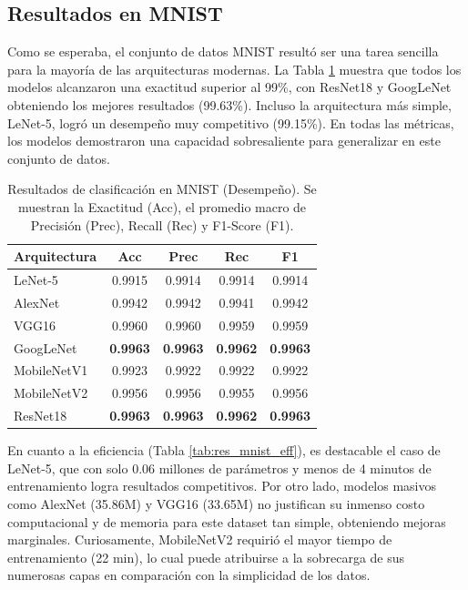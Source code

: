\documentclass{pas}
\begin{document}
\subsection{Resultados en MNIST}

Como se esperaba, el conjunto de datos MNIST resultó ser una tarea sencilla para la mayoría de las arquitecturas modernas. La Tabla \ref{tab:res_mnist_perf} muestra que todos los modelos alcanzaron una exactitud superior al 99\%, con ResNet18 y GoogLeNet obteniendo los mejores resultados (99.63\%). Incluso la arquitectura más simple, LeNet-5, logró un desempeño muy competitivo (99.15\%). En todas las métricas, los modelos demostraron una capacidad sobresaliente para generalizar en este conjunto de datos.

\begin{table}[H]
\centering
\caption{Resultados de clasificación en MNIST (Desempeño). Se muestran la Exactitud (Acc), el promedio macro de Precisión (Prec), Recall (Rec) y F1-Score (F1).}
\label{tab:res_mnist_perf}
\begin{tabular}{lcccc}
\hline
\textbf{Arquitectura} & \textbf{Acc} & \textbf{Prec} & \textbf{Rec} & \textbf{F1} \\ \hline
LeNet-5 & 0.9915 & 0.9914 & 0.9914 & 0.9914 \\
AlexNet & 0.9942 & 0.9942 & 0.9941 & 0.9942 \\
VGG16 & 0.9960 & 0.9960 & 0.9959 & 0.9959 \\
GoogLeNet & \textbf{0.9963} & \textbf{0.9963} & \textbf{0.9962} & \textbf{0.9963} \\
MobileNetV1 & 0.9923 & 0.9922 & 0.9922 & 0.9922 \\
MobileNetV2 & 0.9956 & 0.9956 & 0.9955 & 0.9956 \\
ResNet18 & \textbf{0.9963} & \textbf{0.9963} & \textbf{0.9962} & \textbf{0.9963} \\
\hline
\end{tabular}
\end{table}

En cuanto a la eficiencia (Tabla \ref{tab:res_mnist_eff}), es destacable el caso de LeNet-5, que con solo 0.06 millones de parámetros y menos de 4 minutos de entrenamiento logra resultados competitivos. Por otro lado, modelos masivos como AlexNet (35.86M) y VGG16 (33.65M) no justifican su inmenso costo computacional y de memoria para este dataset tan simple, obteniendo mejoras marginales. Curiosamente, MobileNetV2 requirió el mayor tiempo de entrenamiento (22 min), lo cual puede atribuirse a la sobrecarga de sus numerosas capas en comparación con la simplicidad de los datos.
\end{document}

